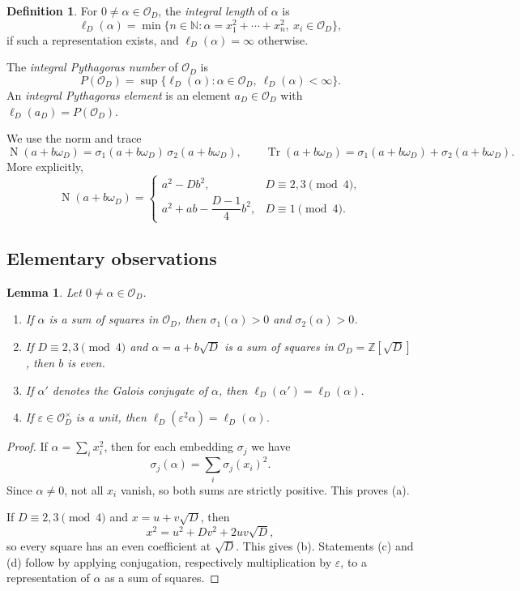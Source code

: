 \documentclass[manuscript,screen]{acmart}
\theoremstyle{plain}
\newtheorem{lemma}[theorem]{Lemma}
\theoremstyle{definition}
\newtheorem{definition}[theorem]{Definition}
\theoremstyle{nonitalicremark}
\newcommand{\Z}{\mathbb{Z}}
\newcommand{\OD}{\mathcal{O}_D}
\newcommand{\len}{\ell}
\newcommand{\wD}{\omega_D}
\newcommand{\sig}{\sigma}
\newcommand{\eps}{\varepsilon}
\newcommand{\Tr}{\operatorname{Tr}}
\newcommand{\Norm}{\operatorname{N}}
\begin{document}
\begin{definition}
For $0 \neq \alpha \in \OD$, the \emph{integral length} of $\alpha$ is
\[
\len_D(\alpha)=
\min\bigl\{n\in\mathbb N : \alpha=x_1^2+\cdots+x_n^2,\ x_i\in\OD\bigr\},
\]
if such a representation exists, and $\len_D(\alpha)=\infty$ otherwise.

The \emph{integral Pythagoras number} of $\OD$ is
\[
P(\OD)=\sup\bigl\{\len_D(\alpha) : \alpha \in \OD,\ \len_D(\alpha)<\infty\bigr\}.
\]
An \emph{integral Pythagoras element} is an element $a_D \in \OD$ with
$\len_D(a_D)=P(\OD)$.
\end{definition}

We use the norm and trace
\[
\Norm(a+b\wD)=\sig_1(a+b\wD)\,\sig_2(a+b\wD), \qquad
\Tr(a+b\wD)=\sig_1(a+b\wD)+\sig_2(a+b\wD).
\]
More explicitly,
\[
\Norm(a+b\wD)=
\begin{cases}
 a^2-Db^2, & D\equiv 2,3 \pmod 4,\\[0.4em]
 a^2+ab-\dfrac{D-1}{4}b^2, & D\equiv 1 \pmod 4.
\end{cases}
\]

\subsection{Elementary observations}

\begin{lemma}\label{lem:basicobs}
Let $0 \neq \alpha \in \OD$.
\begin{enumerate}[label=\textup{(\alph*)},itemsep=0.25em]
\item If $\alpha$ is a sum of squares in $\OD$, then $\sig_1(\alpha)>0$ and
$\sig_2(\alpha)>0$.
\item If $D\equiv 2,3 \pmod 4$ and $\alpha=a+b\sqrt D$ is a sum of squares in
$\OD=\Z[\sqrt D]$, then $b$ is even.
\item If $\alpha'$ denotes the Galois conjugate of $\alpha$, then
$\len_D(\alpha')=\len_D(\alpha)$.
\item If $\eps \in \OD^{\times}$ is a unit, then
$\len_D(\eps^2\alpha)=\len_D(\alpha)$.
\end{enumerate}
\end{lemma}

\begin{proof}
If $\alpha = \sum_i x_i^2$, then for each embedding $\sig_j$ we have
\[
\sig_j(\alpha)=\sum_i \sig_j(x_i)^2.
\]
Since $\alpha \neq 0$, not all $x_i$ vanish, so both sums are strictly positive. This proves
\textup{(a)}.

If $D \equiv 2,3 \pmod 4$ and $x=u+v\sqrt D$, then
\[
x^2 = u^2 + Dv^2 + 2uv\sqrt D,
\]
so every square has an even coefficient at $\sqrt D$. This gives \textup{(b)}.
Statements \textup{(c)} and \textup{(d)} follow by applying conjugation, respectively
multiplication by $\eps$, to a representation of $\alpha$ as a sum of squares.
\end{proof}
\end{document}
